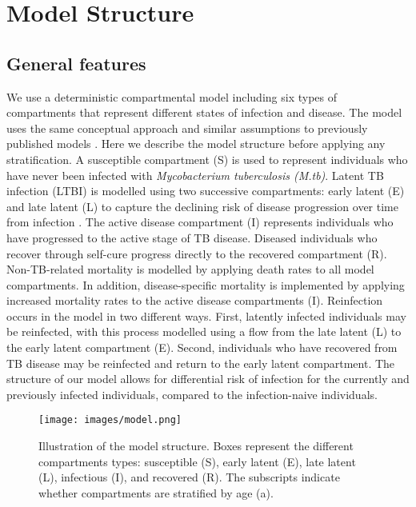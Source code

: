 
\section{Model Structure}

\subsection{General features}

We use a deterministic compartmental model including six types of compartments that represent 
different states of infection and disease. The model uses the same conceptual approach and similar 
assumptions to previously published models \cite{trauer-2017, ragonnet-2019, ragonnet-2021, ragonnet-2022}. 
Here we describe the model structure before applying any stratification. 
\newline
A susceptible compartment (S) is used to represent individuals who have 
never been infected with \emph{Mycobacterium tuberculosis (M.tb)}. Latent TB infection (LTBI) is modelled 
using two successive compartments: early latent (E) and late latent (L) to capture the declining risk of 
disease progression over time from infection \cite{ragonnet-2017}. The active disease compartment (I) represents 
individuals who have progressed to the active stage of TB disease. Diseased individuals who recover 
through self-cure progress directly to the recovered compartment (R).
\newline
Non-TB-related mortality is modelled by applying death rates to all model compartments. In addition, 
disease-specific mortality is implemented by applying increased mortality rates to the active disease 
compartments (I).
\newline
Reinfection occurs in the model in two different ways. First, latently infected individuals may be 
reinfected, with this process modelled using a flow from the late latent (L) to the early latent 
compartment (E). Second, individuals who have recovered from TB disease may be reinfected and 
return to the early latent compartment. The structure of our model allows for differential risk of 
infection for the currently and previously infected individuals, compared to the infection-naive 
individuals.
\begin{figure}[!htbp]
    \texttt{[image: images/model.png]}
    \caption{Illustration of the model structure. 
    Boxes represent the different compartments types: susceptible (S), early latent (E), late latent (L), infectious (I), and recovered (R).
    The subscripts indicate whether compartments are stratified by age (a).}
    \label{fig:model}
\end{figure}


